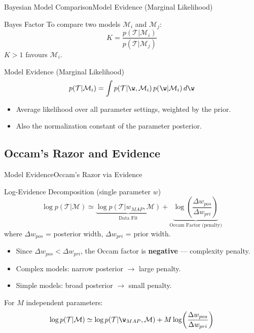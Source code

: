 \begin{frame}{Bayesian Model Comparison}{Model Evidence (Marginal Likelihood)}
  \begin{block}{Bayes Factor}
    To compare two models $\mathcal{M}_i$ and $\mathcal{M}_j$:
    \[
      K = \frac{p(\mathcal{T}|\mathcal{M}_i)}{p(\mathcal{T}|\mathcal{M}_j)}
    \]
    $K > 1$ favours $\mathcal{M}_i$.
  \end{block}

  \begin{block}{Model Evidence (Marginal Likelihood)}
    \[
      p(\mathcal{T}|\mathcal{M}_i) = \int p(\mathcal{T}|\w,\mathcal{M}_i)\,p(\w|\mathcal{M}_i)\,d\w
    \]
    \begin{itemize}
      \item Average likelihood over all parameter settings, weighted by the prior.
      \item Also the normalization constant of the parameter posterior.
    \end{itemize}
  \end{block}
\end{frame}

\subsection{Occam's Razor and Evidence}

\begin{frame}{Model Evidence}{Occam's Razor via Evidence}
  \begin{block}{Log-Evidence Decomposition (single parameter $w$)}
    \[
      \log p(\mathcal{T}|\mathcal{M}) \simeq \underbrace{\log p(\mathcal{T}|w_{MAP},\mathcal{M})}_{\text{Data Fit}} + \underbrace{\log\!\left(\frac{\Delta w_{pos}}{\Delta w_{pri}}\right)}_{\text{Occam Factor (penalty)}}
    \]
    where $\Delta w_{pos}$ = posterior width, $\Delta w_{pri}$ = prior width.
  \end{block}

  \begin{itemize}
    \item Since $\Delta w_{pos} < \Delta w_{pri}$, the Occam factor is \textbf{negative} — complexity penalty.
    \item Complex models: narrow posterior $\to$ large penalty.
    \item Simple models: broad posterior $\to$ small penalty.
  \end{itemize}

  For $M$ independent parameters:
  \[
    \log p(\mathcal{T}|\mathcal{M}) \simeq \log p(\mathcal{T}|\w_{MAP},\mathcal{M}) + M\log\!\left(\frac{\Delta w_{pos}}{\Delta w_{pri}}\right)
  \]
\end{frame}

